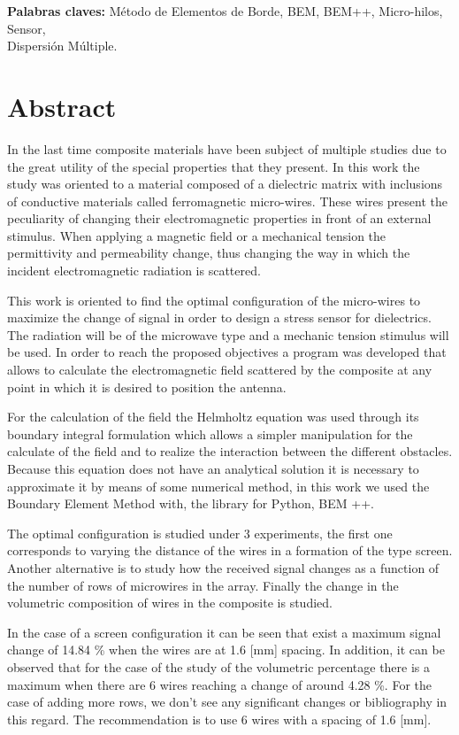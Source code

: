 \documentclass[12pt,letterpaper]{article}
\numberwithin{equation}{section}
\begin{document}
\noindent\textbf{Palabras claves:} Método de Elementos de Borde, BEM, BEM++, Micro-hilos, Sensor,\\ Dispersión Múltiple.
\pagebreak
\section*{Abstract}
In the last time composite materials have been subject of multiple studies due to the great utility of the special properties that they present. In this work the study was oriented to a material composed of a dielectric matrix with inclusions of conductive materials called ferromagnetic micro-wires. These wires present the peculiarity of changing their electromagnetic properties in front of an external stimulus. When applying a magnetic field or a mechanical tension the permittivity and permeability change, thus changing the way in which the incident electromagnetic radiation is scattered.

This work is oriented to find the optimal configuration of the micro-wires to maximize the change of signal in order to design a stress sensor for dielectrics. The radiation will be of the microwave type and a mechanic tension stimulus will be used. In order to reach the proposed objectives a program was developed that allows to calculate the electromagnetic field scattered by the composite at any point in which it is desired to position the antenna.

For the calculation of the field the Helmholtz equation was used through its boundary integral formulation which allows a simpler manipulation for the calculate of the field and to realize the interaction between the different obstacles. Because this equation does not have an analytical solution it is necessary to approximate it by means of some numerical method, in this work we used the Boundary Element Method with, the library for Python, BEM ++.

The optimal configuration is studied under 3 experiments, the first one corresponds to varying the distance of the wires in a formation of the type screen. Another alternative is to study how the received signal changes as a function of the number of rows of microwires in the array. Finally the change in the volumetric composition of wires in the composite is studied.

In the case of a screen configuration it can be seen that exist a maximum signal change of 14.84 \% when the wires are at 1.6 [mm] spacing. In addition, it can be observed that for the case of the study of the volumetric percentage there is a maximum when there are 6 wires reaching a change of around 4.28 \%. For the case of adding more rows, we don't see any significant changes or bibliography in this regard. The recommendation is to use 6 wires with a spacing of 1.6 [mm].\\
\end{document}

